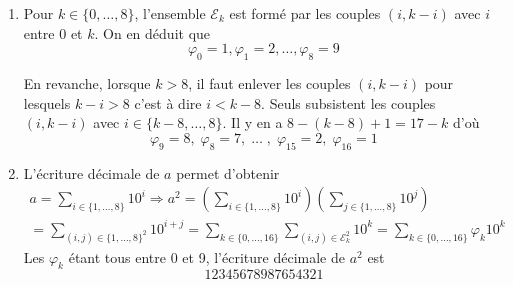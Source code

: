 \begin{enumerate}
\item
Pour $k \in \{0,\ldots,8\}$, l'ensemble $\mathcal{E}_k$ est form{\'e} par les couples $(i,k-i)$ avec $i$ entre $0$ et $k$. On en d{\'e}duit que
\begin{displaymath}
 \varphi_0=1,\varphi_1=2,\ldots,\varphi_8=9
\end{displaymath}

En revanche, lorsque $k>8$, il faut enlever les couples $(i,k-i)$ pour lesquels $k-i>8$ c'est {\`a} dire $i<k-8$. Seuls subsistent les couples $(i,k-i)$ avec $i\in \{k-8,\ldots,8\}$. Il y en a $8-(k-8)+1=17-k$ d'o{\`u}
\begin{displaymath}
\varphi_9=8,\; \varphi_8 = 7,\; \ldots \; , \;\varphi_{15}=2 , \;\varphi_{16}=1 
\end{displaymath}

\item
L'{\'e}criture d{\'e}cimale de $a$ permet d'obtenir
\begin{multline*}
a=\sum_{i\in \{1,\ldots,8\}}10^i \Rightarrow 
a^2=\left(\sum_{i\in \{1,\ldots,8\}}10^i \right)
\left( {\sum_{j\in \{1,\ldots,8\}}10^j }\right)\\
= \sum_{(i,j)\in \{1,\ldots,8\}^2}10^{i+j}
=\sum_{k \in \{0,\ldots,16\}}\sum_{(i,j) \in \mathcal{E}_k^2}10^k=\sum_{k \in \{0,\ldots,16\}}\varphi_k 10^k
\end{multline*}
Les $\varphi_k$ {\'e}tant tous entre 0 et 9, l'{\'e}criture d{\'e}cimale de $a^2$ est $$12345678987654321$$
\end{enumerate}